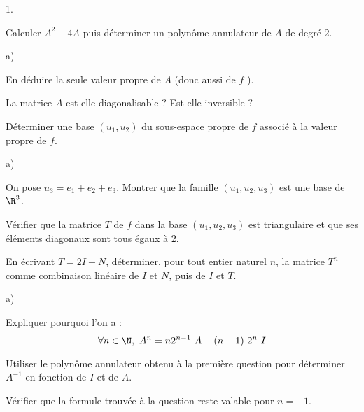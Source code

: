 \documentclass[11pt]{article}%
\begin{document}
\begin{noliste}{1.}
  \setlength{\itemsep}{4mm}
\item Calculer $A^{2}-4A$ puis déterminer un polynôme annulateur de
  $A$ de degré $2$.

  

\item
  \begin{noliste}{a)}
    \setlength{\itemsep}{2mm}
  \item En déduire la seule valeur propre de $A$ (donc aussi de $f$ ).

    		

  \item La matrice $A$ est-elle diagonalisable ? Est-elle inversible ?
  \end{noliste}

    		

\item Déterminer une base $(u_{1},u_{2})$ du sous-espace propre de $f$
  associé à la valeur propre de $f$.

  

\item 
  \begin{noliste}{a)}
    \setlength{\itemsep}{2mm}
  \item On pose $u_{3} = e_{1} + e_{2} + e_{3}$. Montrer que la
    famille $(u_{1},u_{2},u_{3})$ est une base de $\R^{3}$.

    		




  \item Vérifier que la matrice $T$ de $f$ dans la base
    $(u_{1},u_{2},u_{3})$ est triangulaire et que ses éléments
    diagonaux sont tous égaux à 2.

    

  \item En écrivant $T = 2I + N$, déterminer, pour tout entier naturel
    $n$, la matrice $T^{n}$ comme combinaison linéaire de $I$ et $N$,
    puis de $I$ et $T$.

    
  \end{noliste}




\item
  \begin{noliste}{a)}
    \setlength{\itemsep}{2mm}
  \item Expliquer pourquoi l'on a :
    \[
    \forall n\in\N, \ A^{n} = n2^{n-1} \ A - (n-1) \ 2^{n} \ I
    \]

    
    
  \item Utiliser le polynôme annulateur obtenu à la première question
    pour déterminer $A^{-1}$ en fonction de $I$ et de $A$.

    

  \item Vérifier que la formule trouvée à la question  reste
    valable pour $n = -1$.

    
  \end{noliste}
\end{noliste}
\end{document}

